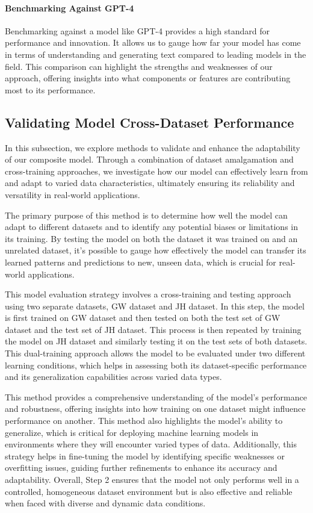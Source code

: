 \paragraph*{Benchmarking Against GPT-4}
\label{par:4_benchmarking_against_gpt-4}
Benchmarking against a model like GPT-4 provides a high standard for performance and innovation. It allows us to gauge how far your model has come in terms of understanding and generating text compared to leading models in the field. This comparison can highlight the strengths and weaknesses of our approach, offering insights into what components or features are contributing most to its performance. 

\subsection{Validating Model Cross-Dataset Performance}
\label{subsec:5_validating_model_cross_dataset_performance}
In this subsection, we explore methods to validate and enhance the adaptability of our composite model. Through a combination of dataset amalgamation and cross-training approaches, we investigate how our model can effectively learn from and adapt to varied data characteristics, ultimately ensuring its reliability and versatility in real-world applications.

The primary purpose of this method is to determine how well the model can adapt to different datasets and to identify any potential biases or limitations in its training. By testing the model on both the dataset it was trained on and an unrelated dataset, it's possible to gauge how effectively the model can transfer its learned patterns and predictions to new, unseen data, which is crucial for real-world applications.

This model evaluation strategy involves a cross-training and testing approach using two separate datasets, GW dataset and JH dataset. In this step, the model is first trained on GW dataset and then tested on both the test set of GW dataset and the test set of JH dataset. This process is then repeated by training the model on JH dataset and similarly testing it on the test sets of both datasets. This dual-training approach allows the model to be evaluated under two different learning conditions, which helps in assessing both its dataset-specific performance and its generalization capabilities across varied data types.

This method provides a comprehensive understanding of the model's performance and robustness, offering insights into how training on one dataset might influence performance on another. This method also highlights the model's ability to generalize, which is critical for deploying machine learning models in environments where they will encounter varied types of data. Additionally, this strategy helps in fine-tuning the model by identifying specific weaknesses or overfitting issues, guiding further refinements to enhance its accuracy and adaptability. Overall, Step 2 ensures that the model not only performs well in a controlled, homogeneous dataset environment but is also effective and reliable when faced with diverse and dynamic data conditions.

